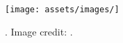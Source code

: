 %
\begin{figure}[htbp]
  \centering
  \texttt{[image: assets/images/]}
  \caption[An]
  {\label{fig:}. Image credit: \href{}{}.}
\end{figure}
%

